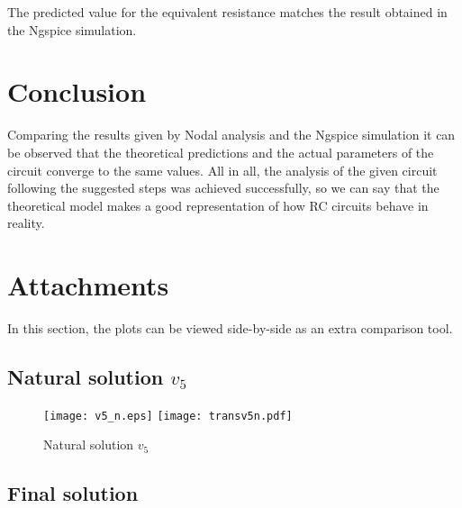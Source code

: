 The predicted value for the equivalent resistance matches the result obtained in the Ngspice simulation.

\section{Conclusion}
\label{sec:conclusion}
Comparing the results given by Nodal analysis and the Ngspice simulation it can be observed that the theoretical predictions and the actual parameters of the circuit converge to the same values. 
All in all, the analysis of the given circuit following the suggested steps was achieved successfully, so we can say that the theoretical model makes a good representation of how RC circuits behave in reality.  \par


\section{Attachments}
\label{sec:attachments}

In this section, the plots can be viewed side-by-side as an extra comparison tool.

\subsection{Natural solution $v_5$}



\begin{figure}[h] \centering
\texttt{[image: v5\_n.eps]}
\texttt{[image: transv5n.pdf]}
\caption{Natural solution $v_5$}
\label{fig:comparison3}
\end{figure}
\FloatBarrier

\subsection{Final solution}

